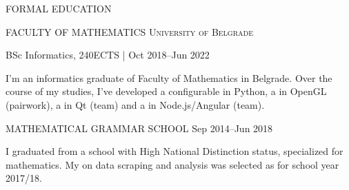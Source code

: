 \begin{minipage}[t]{\linewidth}\vspace{\sectionTopmargin}
{\titleFont\light FORMAL EDUCATION}\newline

\vspace{\titleBottomMargin}
{\subtitleFont\bold FACULTY OF MATHEMATICS \vspace{0.75mm}\newline\extraLight\scshape University of Belgrade}\newline

{\vspace{-3mm}\dateFont\extraLight BSc Informatics, 240ECTS | Oct 2018--Jun 2022}\newline

\vspace{-3mm}
{\contentFont I'm an informatics graduate of Faculty of Mathematics in Belgrade.
Over the course of my studies, I've developed a configurable  in Python, a  in OpenGL (pairwork), a  in Qt (team) and a  in Node.js/Angular (team).}
\end{minipage}\newline%
%
\begin{minipage}[t]{\linewidth}\vspace{\subsectionSpace}
{\subtitleFont\bold MATHEMATICAL GRAMMAR SCHOOL}\newline
{\vfill\vspace{\dateTopMargin}\dateFont\extraLight Sep 2014--Jun 2018\alignRight}\linebreak\newline

\vspace{\contentTopMargin}
{\contentFont I graduated from a school with High National Distinction status, specialized for mathematics. My  on data scraping and analysis was selected as  for school year 2017/18.}
\end{minipage}\newline%
